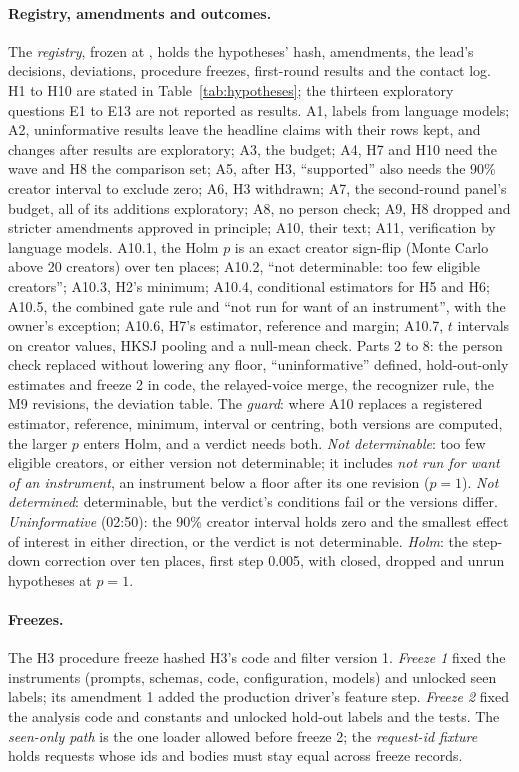 \paragraph{Registry, amendments and outcomes.} The \emph{registry}, frozen at \RegistryFrozenStamp, holds the
hypotheses' hash, amendments, the lead's decisions, deviations, procedure freezes, first-round results and the contact
log. H1 to H10 are stated in Table~\ref{tab:hypotheses}; the thirteen exploratory questions E1 to E13 are not reported
as results. A1, labels from language models; A2, uninformative results leave the headline claims with their rows kept,
and changes after results are exploratory; A3, the budget; A4, H7 and H10 need the wave and H8 the comparison set; A5,
after H3, ``supported'' also needs the 90\% creator interval to exclude zero; A6, H3 withdrawn; A7, the second-round
panel's budget, all of its additions exploratory; A8, no person check; A9, H8 dropped and stricter amendments approved in
principle; A10, their text; A11, verification by language models. A10.1, the Holm $p$ is an exact creator sign-flip (Monte Carlo
above 20 creators) over ten places; A10.2, ``not determinable: too few eligible creators''; A10.3, H2's minimum; A10.4,
conditional estimators for H5 and H6; A10.5, the combined gate rule and ``not run for want of an instrument'', with the
owner's exception; A10.6, H7's estimator, reference and margin; A10.7, $t$ intervals on creator values, HKSJ pooling and
a null-mean check. Parts 2 to 8: the person check replaced without lowering any floor, ``uninformative'' defined,
hold-out-only estimates and freeze 2 in code, the relayed-voice merge, the recognizer rule, the M9 revisions, the
deviation table. The \emph{guard}: where A10 replaces a registered estimator, reference, minimum, interval or centring,
both versions are computed, the larger $p$ enters Holm, and a verdict needs both. \emph{Not determinable}: too few
eligible creators, or either version not determinable; it includes \emph{not run for want of an instrument}, an
instrument below a floor after its one revision ($p = 1$). \emph{Not determined}: determinable, but the verdict's
conditions fail or the versions differ. \emph{Uninformative} (02:50): the 90\% creator interval holds zero and the
smallest effect of interest in either direction, or the verdict is not determinable. \emph{Holm}: the step-down
correction \cite{holm1979simple} over ten places, first step 0.005, with closed, dropped and unrun hypotheses at
$p = 1$.

\paragraph{Freezes.} The H3 procedure freeze hashed H3's code and filter version 1. \emph{Freeze 1} fixed the
instruments (prompts, schemas, code, configuration, models) and unlocked seen labels; its amendment 1 added the
production driver's feature step. \emph{Freeze 2} fixed the analysis code and constants and unlocked hold-out labels and
the tests. The \emph{seen-only path} is the one loader allowed before freeze 2; the \emph{request-id fixture} holds
requests whose ids and bodies must stay equal across freeze records.

